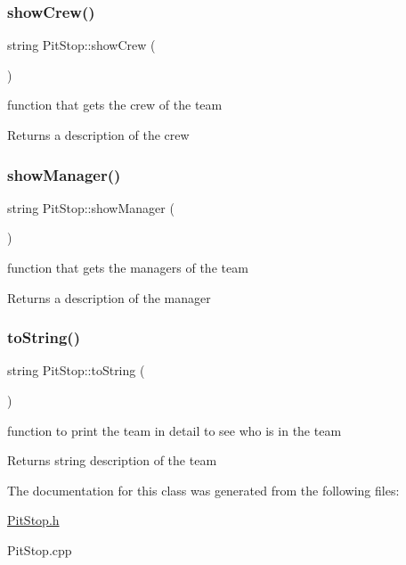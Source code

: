 \subsubsection{\texorpdfstring{show\+Crew()}{showCrew()}}
{\footnotesize\ttfamily string Pit\+Stop\+::show\+Crew (\begin{DoxyParamCaption}{ }\end{DoxyParamCaption})}

function that gets the crew of the team \begin{DoxyReturn}{Returns}
a description of the crew 
\end{DoxyReturn}
\mbox{\label{class_pit_stop_a086c61b9f39bd212d33f569c76ac554e}} 
\subsubsection{\texorpdfstring{show\+Manager()}{showManager()}}
{\footnotesize\ttfamily string Pit\+Stop\+::show\+Manager (\begin{DoxyParamCaption}{ }\end{DoxyParamCaption})}

function that gets the managers of the team \begin{DoxyReturn}{Returns}
a description of the manager 
\end{DoxyReturn}
\mbox{\label{class_pit_stop_a3dcfcb1435c346df2265828a71f96601}} 
\subsubsection{\texorpdfstring{to\+String()}{toString()}}
{\footnotesize\ttfamily string Pit\+Stop\+::to\+String (\begin{DoxyParamCaption}{ }\end{DoxyParamCaption})}

function to print the team in detail to see who is in the team \begin{DoxyReturn}{Returns}
string description of the team 
\end{DoxyReturn}


The documentation for this class was generated from the following files\+:\begin{DoxyCompactItemize}
\item 
\mbox{\hyperlink{_pit_stop_8h}{Pit\+Stop.\+h}}\item 
Pit\+Stop.\+cpp\end{DoxyCompactItemize}
